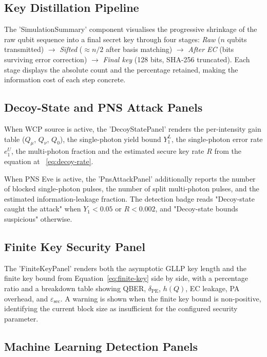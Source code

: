 \documentclass[12pt, a4paper]{article}
\begin{document}
\subsection{Key Distillation Pipeline}
\label{sec:key-pipeline}

The 'SimulationSummary' component visualises the progressive
shrinkage of the raw qubit sequence into a final secret key through
four stages: \textit{Raw} ($n$ qubits transmitted) $\to$
\textit{Sifted} ($\approx n/2$ after basis matching) $\to$
\textit{After EC} (bits surviving error correction) $\to$
\textit{Final key} (128 bits, SHA-256 truncated). Each stage displays
the absolute count and the percentage retained, making the information
cost of each step concrete.

\subsection{Decoy-State and PNS Attack Panels}
\label{sec:decoy-panel}

When WCP source is active, the 'DecoyStatePanel' renders the
per-intensity gain table ($Q_\mu$, $Q_\nu$, $Q_0$), the single-photon
yield bound $Y_1^L$, the single-photon error rate $e_1^U$, the
multi-photon fraction and the estimated secure key rate $R$ from the 
equation at ~\eqref{eq:decoy-rate}.

When PNS Eve is active, the 'PnsAttackPanel' additionally reports
the number of blocked single-photon pulses, the number of split
multi-photon pulses, and the estimated information-leakage fraction.
The detection badge reads "Decoy-state caught the attack" when
$Y_1 < 0.05$ or $R < 0.002$, and "Decoy-state bounds suspicious"
otherwise.

\subsection{Finite Key Security Panel}
\label{sec:finite-panel}

The 'FiniteKeyPanel' renders both the asymptotic GLLP key length
and the finite key bound from Equation~\eqref{eq:finite-key} side by side,
with a percentage ratio and a breakdown table showing QBER, $\delta_\mathrm{PE}$,
$h(Q)$, EC leakage, PA overhead, and $\varepsilon_\mathrm{sec}$. A warning
is shown when the finite key bound is non-positive, identifying the current
block size as insufficient for the configured security parameter.

\subsection{Machine Learning Detection Panels}
\label{sec:ml-panels}
\end{document}
